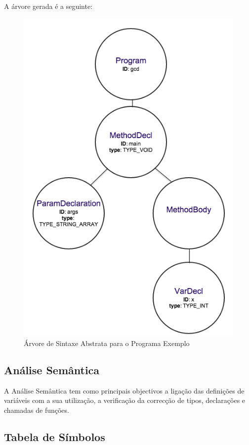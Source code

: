 \documentclass[12pt]{article}
\begin{document}
A árvore gerada é a seguinte:

\begin{figure}[H]
       \centering
       \includegraphics[keepaspectratio=true, scale = 0.5]{arvore.png}
       \caption{Árvore de Sintaxe Abstrata para o Programa Exemplo}
       \end{figure}

 

\subsection{Análise Semântica}
A Análise Semântica tem como principais objectivos a ligação das definições de variáveis com a sua utilização, a verificação da correcção de tipos, declarações e chamadas de funções.

\subsection{Tabela de Símbolos}
\end{document}
